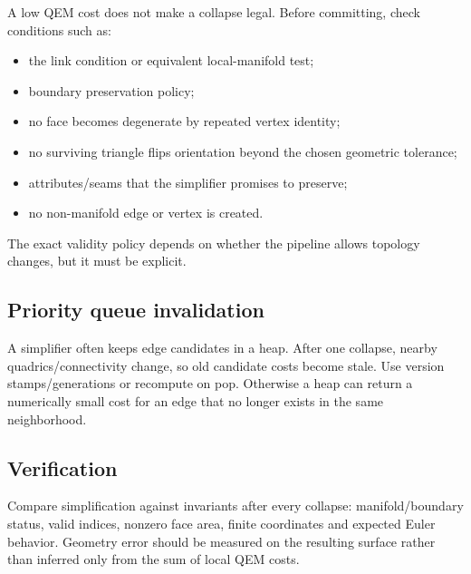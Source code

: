 \hypertarget{appendix-89db9fe1bc8a-topology-gate-before-cost}{}

A low QEM cost does not make a collapse legal. Before committing, check conditions such as:

\begin{itemize}
\tightlist
\item
  the link condition or equivalent local-manifold test;
\item
  boundary preservation policy;
\item
  no face becomes degenerate by repeated vertex identity;
\item
  no surviving triangle flips orientation beyond the chosen geometric tolerance;
\item
  attributes/seams that the simplifier promises to preserve;
\item
  no non-manifold edge or vertex is created.
\end{itemize}

The exact validity policy depends on whether the pipeline allows topology changes, but it must be explicit.

\subsection{Priority queue invalidation}\label{appendix-89db9fe1bc8a-priority-queue-invalidation}

\hypertarget{appendix-89db9fe1bc8a-priority-queue-invalidation}{}

A simplifier often keeps edge candidates in a heap. After one collapse, nearby quadrics/connectivity change, so old candidate costs become stale. Use version stamps/generations or recompute on pop. Otherwise a heap can return a numerically small cost for an edge that no longer exists in the same neighborhood.

\subsection{Verification}\label{appendix-89db9fe1bc8a-verification}

\hypertarget{appendix-89db9fe1bc8a-verification}{}

Compare simplification against invariants after every collapse: manifold/boundary status, valid indices, nonzero face area, finite coordinates and expected Euler behavior. Geometry error should be measured on the resulting surface rather than inferred only from the sum of local QEM costs.

